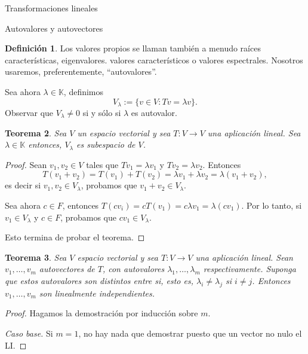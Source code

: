 \documentclass[a4paper,12pt,twoside,spanish,reqno]{amsbook}
\numberwithin{equation}{section}
\newtheorem{teorema}{Teorema}[section]
\theoremstyle{definition}
\newtheorem{definicion}[teorema]{Definici\'on}
\theoremstyle{remark}
\newcommand{\K}{\mathbb K}
\begin{document}
\begin{chapter}{Transformaciones lineales}
\begin{section}{Autovalores y autovectores}
\begin{definicion}
            Los valores propios se llaman también a menudo raíces características, eigenvalores. valores característicos o valores espectrales. Nosotros usaremos, preferentemente, ``autovalores''.
            
            Sea ahora $\lambda \in \K$, definimos
            $$
            V_\lambda := \{v \in V: Tv = \lambda v \}.
            $$
            Observar que $V_\lambda \ne 0$ si y sólo si $\lambda$ es autovalor. 
        \end{definicion}
        
        
        \begin{teorema}
            Sea $V$ un espacio vectorial y sea $T:V \to V$ una aplicación lineal. Sea $\lambda \in \K$ entonces, $V_\lambda$  es subespacio de $V$.
        \end{teorema}
        \begin{proof}
            Sean $v_1,v_2 \in V$ tales que $Tv_1 = \lambda v_1$ y $Tv_2 = \lambda v_2$. Entonces
            $$
            T(v_1+v_2) = T(v_1)+ T(v_2) = \lambda v_1 + \lambda v_2 = \lambda (v_1 + v_2),
            $$
            es decir si  $v_1,v_2 \in V_\lambda$, probamos que $v_1+v_2 \in V_\lambda$. 
            
            Sea ahora $c \in F$, entonces $T(cv_i) = cT(v_1) = c\lambda v_1 = \lambda (cv_1)$. Por lo tanto, si  $v_1\in V_\lambda$ y $c \in F$, probamos que $cv_1 \in V_\lambda$.
            
            Esto termina de probar el teorema.
        \end{proof}

        
        
        \begin{teorema}
            Sea $V$ espacio vectorial y sea $T: V \to V$ una aplicación lineal.  Sean $v_1,\ldots,v_m$ autovectores de $T$, con autovalores $\lambda_1,\ldots,\lambda_m$ respectivamente. Suponga que estos  autovalores son distintos entre si, esto es, $\lambda_i \ne \lambda_j$ si $i \ne j$. Entonces $v_1,\ldots,v_m$ son linealmente independientes.
        \end{teorema}
        \begin{proof}
            Hagamos la demostración por inducción sobre $m$.
            
            \textit{Caso base.} Si $m=1$, no hay nada que demostrar puesto que un vector no nulo el LI.
            
            \medskip
            

\end{proof}
\end{section}
\end{chapter}
\end{document}
